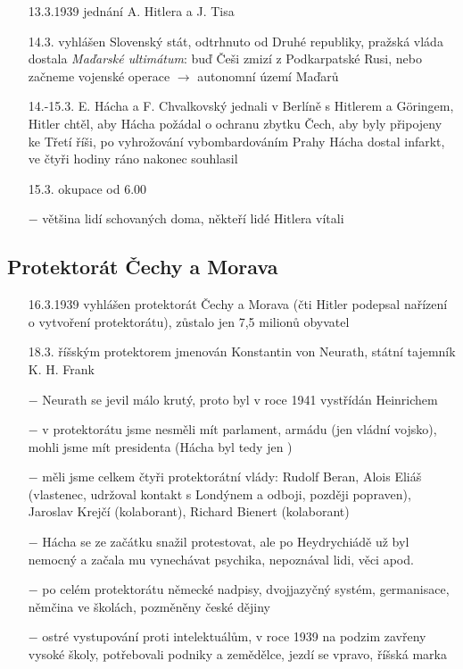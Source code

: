 \documentclass{article}
\begin{document}
\begin{itemize}
    \vspace{-0.5em}
    \setlength\itemsep{0.15em}
    \item[13.3.1939] jednání A. Hitlera a J. Tisa
    \item[14.3.] vyhlášen Slovenský stát, odtrhnuto od Druhé republiky, pražská vláda dostala \textit{Maďarské ultimátum}: buď Češi zmizí z Podkarpatské Rusi, nebo začneme vojenské operace $\rightarrow$ autonomní území Maďarů
    \item[14.-15.3.] E. Hácha a F. Chvalkovský jednali v Berlíně s Hitlerem a Göringem, Hitler chtěl, aby Hácha požádal o ochranu zbytku Čech, aby byly připojeny ke Třetí říši, po vyhrožování vybombardováním Prahy Hácha dostal infarkt, ve čtyři hodiny ráno nakonec souhlasil
    \item[15.3.] okupace od 6.00
    \item[$-$] většina lidí schovaných doma, někteří lidé Hitlera vítali
\end{itemize}

\subsection*{Protektorát Čechy a Morava}
\begin{itemize}
    \vspace{-0.5em}
    \setlength\itemsep{0.15em}
    \item[16.3.1939] vyhlášen protektorát Čechy a Morava (čti Hitler podepsal nařízení o vytvoření protektorátu), zůstalo jen 7,5 milionů obyvatel
    \item[18.3.] říšským protektorem jmenován Konstantin von Neurath, státní tajemník K. H. Frank
    \item[$-$] Neurath se jevil málo krutý, proto byl v roce 1941 vystřídán Heinrichem
    \item[$-$] v protektorátu jsme nesměli mít parlament, armádu (jen vládní vojsko), mohli jsme mít presidenta (Hácha byl tedy jen )
    \item[$-$] měli jsme celkem čtyři protektorátní vlády: Rudolf Beran, Alois Eliáš (vlastenec, udržoval kontakt s Londýnem a odboji, později popraven), Jaroslav Krejčí (kolaborant), Richard Bienert (kolaborant)
    \item[$-$] Hácha se ze začátku snažil protestovat, ale po Heydrychiádě už byl nemocný a začala mu vynechávat psychika, nepoznával lidi, věci apod.
    \item[$-$] po celém protektorátu německé nadpisy, dvojjazyčný systém, germanisace, němčina ve školách, pozměněny české dějiny
    \item[$-$] ostré vystupování proti intelektuálům, v roce 1939 na podzim zavřeny vysoké školy, potřebovali podniky a zemědělce, jezdí se vpravo, říšská marka
\end{itemize}
\end{document}
